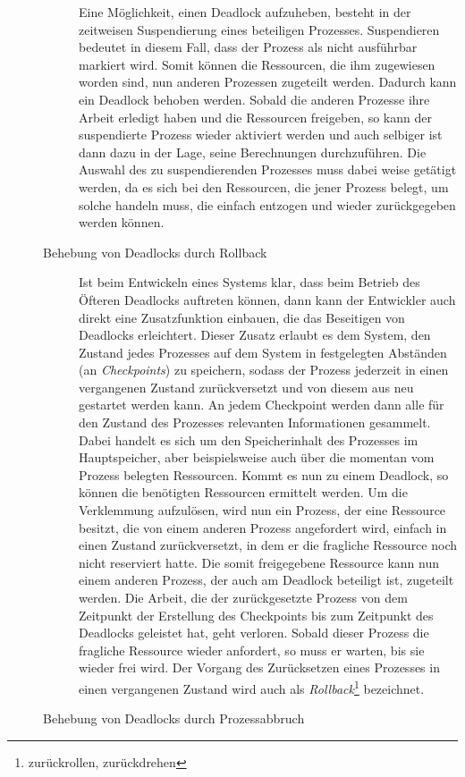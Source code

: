 \begin{description}
\begin{description}
								Eine Möglichkeit, einen Deadlock aufzuheben, besteht in der zeitweisen Suspendierung eines beteiligen Prozesses. Suspendieren bedeutet in diesem Fall, dass der Prozess als nicht ausführbar markiert wird. Somit können die Ressourcen, die ihm zugewiesen worden sind, nun anderen Prozessen zugeteilt werden. Dadurch kann ein Deadlock behoben werden. Sobald die anderen Prozesse ihre Arbeit erledigt haben und die Ressourcen freigeben, so kann der suspendierte Prozess wieder aktiviert werden und auch selbiger ist dann dazu in der Lage, seine Berechnungen durchzuführen. Die Auswahl des zu suspendierenden Prozesses muss dabei weise getätigt werden, da es sich bei den Ressourcen, die jener Prozess belegt, um solche handeln muss, die einfach entzogen und wieder zurückgegeben werden können.
								\item[Behebung von Deadlocks durch Rollback]
								Ist beim Entwickeln eines Systems klar, dass beim Betrieb des Öfteren Deadlocks auftreten können, dann kann der Entwickler auch direkt eine Zusatzfunktion einbauen, die das Beseitigen von Deadlocks erleichtert. Dieser Zusatz erlaubt es dem System, den Zustand jedes Prozesses auf dem System in festgelegten Abständen (an \textit{Checkpoints}) zu speichern, sodass der Prozess jederzeit in einen vergangenen Zustand zurückversetzt und von diesem aus neu gestartet werden kann. An jedem Checkpoint werden dann alle für den Zustand des Prozesses relevanten Informationen gesammelt. Dabei handelt es sich um den Speicherinhalt des Prozesses im Hauptspeicher, aber beispielsweise auch über die momentan vom Prozess belegten Ressourcen.
								Kommt es nun zu einem Deadlock, so können die benötigten Ressourcen ermittelt werden. Um die Verklemmung aufzulösen, wird nun ein Prozess, der eine Ressource besitzt, die von einem anderen Prozess angefordert wird, einfach in einen Zustand zurückversetzt, in dem er die fragliche Ressource noch nicht reserviert hatte. Die somit freigegebene Ressource kann nun einem anderen Prozess, der auch am Deadlock beteiligt ist, zugeteilt werden. Die Arbeit, die der zurückgesetzte Prozess von dem Zeitpunkt der Erstellung des Checkpoints bis zum Zeitpunkt des Deadlocks geleistet hat, geht verloren. Sobald dieser Prozess die fragliche Ressource wieder anfordert, so muss er warten, bis sie wieder frei wird. Der Vorgang des Zurücksetzen eines Prozesses in einen vergangenen Zustand wird auch als \textit{Rollback}\footnote{zurückrollen, zurückdrehen} bezeichnet.
								\item[Behebung von Deadlocks durch Prozessabbruch]

\end{description}
\end{description}
